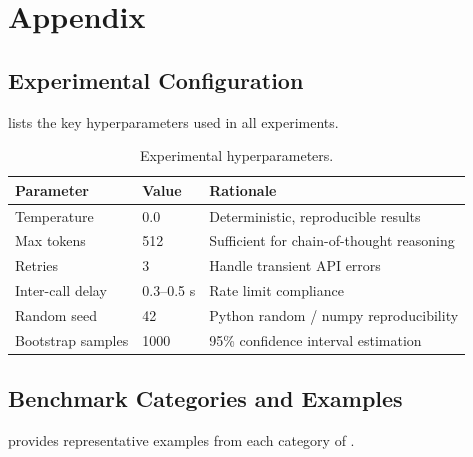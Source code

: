 \section{Appendix}
\label{sec:appendix}

\subsection{Experimental Configuration}
\label{app:config}

 lists the key hyperparameters used in all experiments.

\begin{table}[h]
\centering
\caption{Experimental hyperparameters.}
\label{tab:hyperparams}
\begin{tabular}{@{}lll@{}}
\toprule
Parameter & Value & Rationale \\
\midrule
Temperature        & 0.0    & Deterministic, reproducible results \\
Max tokens         & 512    & Sufficient for chain-of-thought reasoning \\
Retries            & 3      & Handle transient API errors \\
Inter-call delay   & 0.3--0.5 s & Rate limit compliance \\
Random seed        & 42     & Python random / numpy reproducibility \\
Bootstrap samples  & 1000   & 95\% confidence interval estimation \\
\bottomrule
\end{tabular}
\end{table}

\subsection{Benchmark Categories and Examples}
\label{app:benchmark}

 provides representative examples from each
category of \advbench.

